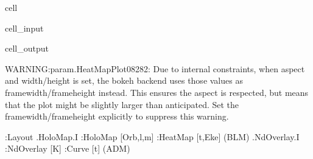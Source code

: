 \documentclass[letterpaper,table,10pt,english]{jupyterBook}
\begin{document}
\begin{sphinxuseclass}{cell}
\begin{sphinxVerbatimInput}
\begin{sphinxuseclass}{cell_input}
\end{sphinxuseclass}\end{sphinxVerbatimInput}
\begin{sphinxVerbatimOutput}

\begin{sphinxuseclass}{cell_output}
\begin{sphinxVerbatim}[commandchars=\\\{\}]
WARNING:param.HeatMapPlot08282: Due to internal constraints, when aspect and width/height is set, the bokeh backend uses those values as frame\PYGZus{}width/frame\PYGZus{}height instead. This ensures the aspect is respected, but means that the plot might be slightly larger than anticipated. Set the frame\PYGZus{}width/frame\PYGZus{}height explicitly to suppress this warning.
\end{sphinxVerbatim}

\begin{sphinxVerbatim}[commandchars=\\\{\}]
:Layout
   .HoloMap.I   :HoloMap   [Orb,l,m]
      :HeatMap   [t,Eke]   (BLM)
   .NdOverlay.I :NdOverlay   [K]
      :Curve   [t]   (ADM)
\end{sphinxVerbatim}

\end{sphinxuseclass}\end{sphinxVerbatimOutput}

\end{sphinxuseclass}
\end{document}
